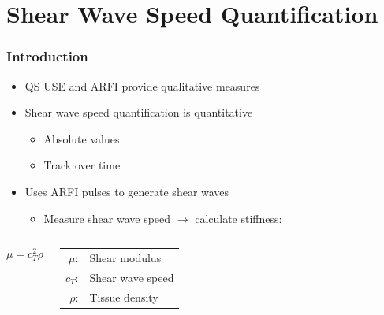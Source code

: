 \documentclass{beamer}
\begin{document}
	\section[Shear]{Shear Wave Speed Quantification}
		\begin{frame}
			\frametitle{Introduction}
			\begin{itemize}
				\item QS USE and ARFI provide \alert{qualitative} measures
				\item Shear wave speed quantification is \alert{quantitative}
				\begin{itemize}
					\item Absolute values
					\item Track over time
				\end{itemize}
				\item Uses ARFI pulses to generate shear waves
				\begin{itemize}
					\item Measure shear wave speed $\rightarrow$ calculate stiffness:
				\end{itemize}
			\end{itemize}

			\vspace{1cm}
			\begin{columns}[c]
					\begin{equation*}
						\mu = c_T^2 \rho
					\end{equation*}

					\begin{tabular}{rl}
						$\mu$: & Shear modulus \\
						$c_T$: & Shear wave speed \\
						$\rho$: & Tissue density \\
					\end{tabular}

			\end{columns}
		\end{frame}
\end{document}

